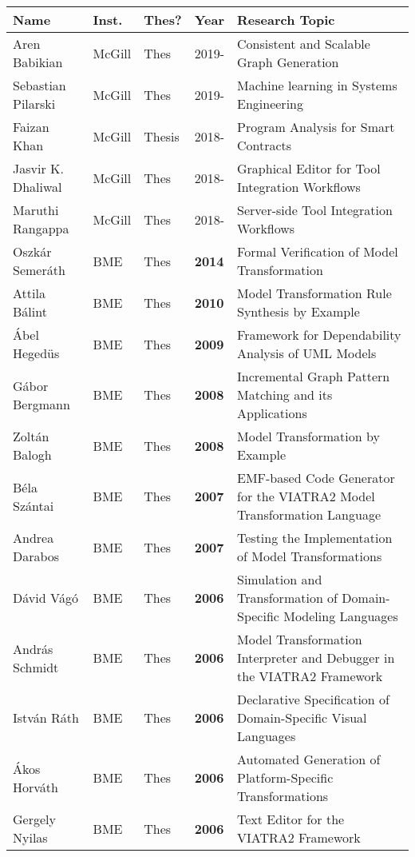 \documentclass{xetexCV}
\begin{document}
\begin{table}[p]
\begin{tabular}{@{}llllp{9cm}@{}}
\toprule
\textbf{Name} & \textbf{Inst.} & \textbf{Thes?} & \textbf{Year} & \textbf{Research Topic} \\ \midrule
Aren Babikian & McGill & Thes & 2019-   & Consistent and Scalable Graph Generation \\
Sebastian Pilarski & McGill & Thes & 2019- & Machine learning in Systems Engineering \\
Faizan Khan & McGill & Thesis & 2018-   & Program Analysis for Smart Contracts \\
Jasvir K. Dhaliwal & McGill & Thes & 2018-   & Graphical Editor for Tool Integration Workflows \\
Maruthi Rangappa & McGill & Thes & 2018-   & Server-side Tool Integration Workflows \\ \midrule
Oszk\'ar Semer\'ath & BME & Thes & \textbf{2014} & Formal Verification of Model Transformation\\ 
Attila B\'alint & BME & Thes & \textbf{2010} & Model Transformation Rule Synthesis by Example\\ 
\'Abel Heged\"us & BME & Thes & \textbf{2009} & Framework for Dependability Analysis of UML Models\\ 
G\'abor Bergmann & BME & Thes & \textbf{2008} & Incremental Graph Pattern Matching and its Applications\\ 
Zolt\'an Balogh & BME & Thes & \textbf{2008} & Model Transformation by Example\\ 
B\'ela Sz\'antai & BME & Thes & \textbf{2007} & EMF-based Code Generator for the VIATRA2 Model Transformation Language \\ 
Andrea Darabos & BME & Thes & \textbf{2007} & Testing the Implementation of Model Transformations\\ 
D\'avid V\'ag\'o & BME & Thes & \textbf{2006} & Simulation and Transformation of Domain-Specific Modeling Languages\\ 
Andr\'as Schmidt & BME & Thes & \textbf{2006} & Model Transformation Interpreter and Debugger in the VIATRA2 Framework\\ 
Istv\'an R\'ath & BME & Thes & \textbf{2006} & Declarative Specification of Domain-Specific Visual Languages\\ 
\'Akos Horv\'ath & BME & Thes & \textbf{2006} & Automated Generation of Platform-Specific Transformations\\ 
Gergely Nyilas & BME & Thes & \textbf{2006} & Text Editor for the VIATRA2 Framework \\ 

\end{tabular}
\end{table}
\end{document}
